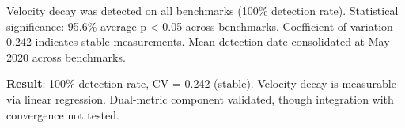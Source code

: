 
Velocity decay was detected on all benchmarks (100\% detection rate). Statistical significance: 95.6\% average p < 0.05 across benchmarks. Coefficient of variation 0.242 indicates stable measurements. Mean detection date consolidated at May 2020 across benchmarks.

\textbf{Result}: 100\% detection rate, CV = 0.242 (stable). Velocity decay is measurable via linear regression. Dual-metric component validated, though integration with convergence not tested.
